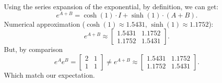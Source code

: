 \documentclass{article}
\begin{document}
    Using the series expansion of the exponential, by definition, we can get:
    \[
        e^{A+B} = \cosh(1) \cdot I + \sinh(1) \cdot (A+B).
    \]
    Numerical approximation (\( \cosh(1) \approx 1.5431 \), \( \sinh(1) \approx 1.1752 \)):
    \[
        e^{A+B} \approx \begin{bmatrix}
        1.5431 & 1.1752 \\ 1.1752 & 1.5431
        \end{bmatrix}.
    \]
    But, by comparison
    \[
        e^{A} e^{B} = \begin{bmatrix}
        2 & 1 \\ 1 & 1
        \end{bmatrix} \neq
        e^{A+B} \approx \begin{bmatrix}
        1.5431 & 1.1752 \\ 1.1752 & 1.5431
        \end{bmatrix}.
    \]
    Which match our expectation.
\end{document}

